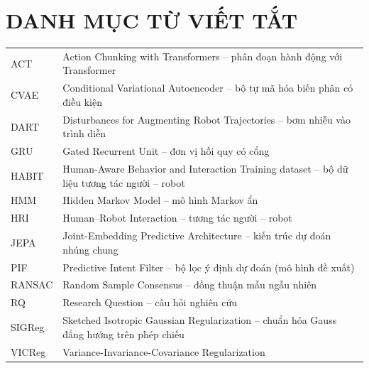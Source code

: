\chapter*{DANH MỤC TỪ VIẾT TẮT}

\begin{longtable}{@{}p{0.8in}p{4.7in}@{}}
  ACT    & Action Chunking with Transformers -- phân đoạn hành động với Transformer \\[4pt]
  CVAE   & Conditional Variational Autoencoder -- bộ tự mã hóa biến phân có điều kiện \\[4pt]
  DART   & Disturbances for Augmenting Robot Trajectories -- bơm nhiễu vào trình diễn \\[4pt]
  GRU    & Gated Recurrent Unit -- đơn vị hồi quy có cổng \\[4pt]
  HABIT  & Human-Aware Behavior and Interaction Training dataset -- bộ dữ liệu tương tác người -- robot \\[4pt]
  HMM    & Hidden Markov Model -- mô hình Markov ẩn \\[4pt]
  HRI    & Human--Robot Interaction -- tương tác người -- robot \\[4pt]
  JEPA   & Joint-Embedding Predictive Architecture -- kiến trúc dự đoán nhúng chung \\[4pt]
  PIF    & Predictive Intent Filter -- bộ lọc ý định dự đoán (mô hình đề xuất) \\[4pt]
  RANSAC & Random Sample Consensus -- đồng thuận mẫu ngẫu nhiên \\[4pt]
  RQ     & Research Question -- câu hỏi nghiên cứu \\[4pt]
  SIGReg & Sketched Isotropic Gaussian Regularization -- chuẩn hóa Gauss đẳng hướng trên phép chiếu \\[4pt]
  VICReg & Variance-Invariance-Covariance Regularization \\
\end{longtable}
